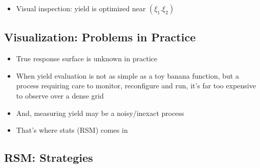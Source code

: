 \documentclass[
  letterpaper,
  DIV=11,
  numbers=noendperiod]{scrreprt}
\providecommand{\tightlist}{%
  \setlength{\itemsep}{0pt}\setlength{\parskip}{0pt}}\usepackage{longtable,booktabs,array}
\begin{document}
\begin{itemize}
\tightlist
\item
  Visual inspection: yield is optimized near \((\xi_1. \xi_2)\)
\end{itemize}

\hypertarget{visualization-problems-in-practice}{%
\subsection{Visualization: Problems in
Practice}\label{visualization-problems-in-practice}}

\begin{itemize}
\tightlist
\item
  True response surface is unknown in practice
\item
  When yield evaluation is not as simple as a toy banana function, but a
  process requiring care to monitor, reconfigure and run, it's far too
  expensive to observe over a dense grid
\item
  And, measuring yield may be a noisy/inexact process
\item
  That's where stats (RSM) comes in
\end{itemize}

\hypertarget{rsm-strategies}{%
\subsection{RSM: Strategies}\label{rsm-strategies}}
\end{document}
